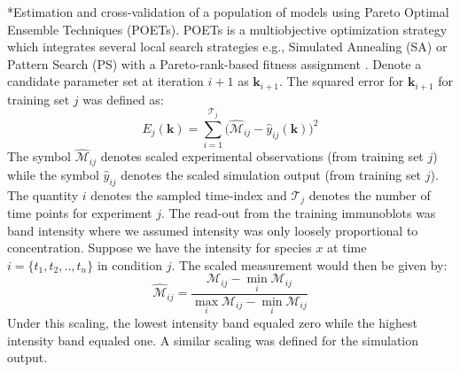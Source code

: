 \documentclass[12pt]{article}
\makeatletter
\renewcommand\subsection{\@startsection
	{subsection}{2}{0mm}
	{-0.05in}
	{-0.5\baselineskip}
	{\normalfont\normalsize\bfseries}}
\makeatother
\begin{document}
\subsection*{Estimation and cross-validation of a population of models using Pareto Optimal Ensemble Techniques (POETs).}
POETs is a multiobjective optimization strategy which integrates several local search strategies e.g., Simulated Annealing (SA) or Pattern Search (PS) 
with a Pareto-rank-based fitness assignment \cite{Song:2010ij}.
Denote a candidate parameter set at iteration $i+1$ as $\mathbf{k}_{i+1}$. 
The squared error for $\mathbf{k}_{i+1}$ for training set $j$ was defined as:
\begin{equation}\label{eqn_cost2}
	E_{j}(\mathbf{k}) = \sum_{i=1}^{\mathcal{T}_{j}}\biggl(\hat{\mathcal{M}}_{ij}-\hat{y}_{ij}(\mathbf{k})\biggr)^2
\end{equation}
The symbol $\hat{\mathcal{M}}_{ij}$ denotes scaled experimental observations (from training set $j$) while the symbol $\hat{y}_{ij}$ denotes the scaled simulation output (from training set $j$). 
The quantity $i$ denotes the sampled time-index and $\mathcal{T}_{j}$ denotes the number of time points for experiment $j$. 
The read-out from the training immunoblots was band intensity where we assumed intensity was only loosely proportional to concentration.
Suppose we have the intensity for species $x$ at time $i=\{t_{1},t_{2},..,t_{n}\}$ in condition $j$. The scaled measurement would then be given by:
\begin{equation}\label{norm_exp_data}
\hat{\mathcal{M}}_{ij} = \frac{\mathcal{M}_{ij} - \min_{i}\mathcal{M}_{ij}}{\max_{i}{\mathcal{M}_{ij}}-\min_{i}{\mathcal{M}_{ij}}}
\end{equation}
Under this scaling, the lowest intensity band equaled zero while the highest intensity band equaled one. 
A similar scaling was defined for the simulation output. 
\end{document}
